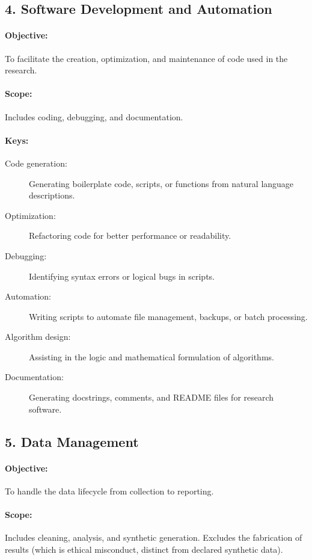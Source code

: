 \documentclass[11pt]{article}
\begin{document}
\subsection*{4. Software Development and Automation}
\paragraph{Objective:} To facilitate the creation, optimization, and maintenance of code used in the research.
\paragraph{Scope:} Includes coding, debugging, and documentation.
\paragraph{Keys:}
\begin{description}
    \item[Code generation:] Generating boilerplate code, scripts, or functions from natural language descriptions.
    \item[Optimization:] Refactoring code for better performance or readability.
    \item[Debugging:] Identifying syntax errors or logical bugs in scripts.
    \item[Automation:] Writing scripts to automate file management, backups, or batch processing.
    \item[Algorithm design:] Assisting in the logic and mathematical formulation of algorithms.
    \item[Documentation:] Generating docstrings, comments, and README files for research software.
\end{description}

\subsection*{5. Data Management}
\paragraph{Objective:} To handle the data lifecycle from collection to reporting.
\paragraph{Scope:} Includes cleaning, analysis, and synthetic generation.
Excludes the fabrication of results (which is ethical misconduct, distinct from declared synthetic data).
\end{document}
